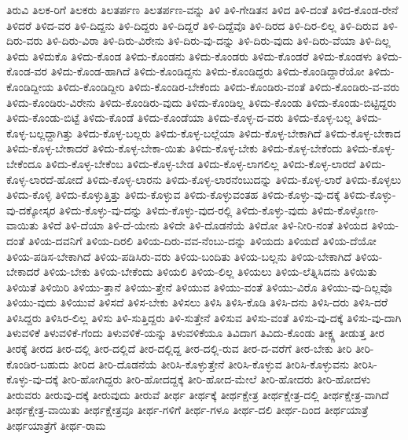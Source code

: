 {ತಿರುವಿ
ತಿಲಕ-ರಿಗೆ
ತಿಲಕರು
ತಿಲತರ್ಪಣ
ತಿಲತರ್ಪಣ-ವನ್ನು
ತಿಳಿ
ತಿಳಿ-ಗೇಡಿತನ
ತಿಳಿದ
ತಿಳಿ-ದಂತೆ
ತಿಳಿದ-ಕೊಂಡ-ರೇನೆ
ತಿಳಿದರೆ
ತಿಳಿದ-ವರ
ತಿಳಿ-ದಿದ್ದನು
ತಿಳಿ-ದಿದ್ದರು
ತಿಳಿ-ದಿದ್ದರೆ
ತಿಳಿ-ದಿದ್ದೆವೊ
ತಿಳಿ-ದಿರದ
ತಿಳಿ-ದಿರ-ಲಿಲ್ಲ
ತಿಳಿ-ದಿರುವ
ತಿಳಿ-ದಿರು-ವರು
ತಿಳಿ-ದಿರು-ವಿರಾ
ತಿಳಿ-ದಿರು-ವಿರೇನು
ತಿಳಿ-ದಿರು-ವು-ದನ್ನು
ತಿಳಿ-ದಿರು-ವುದು
ತಿಳಿ-ದಿರು-ವೆಯಾ
ತಿಳಿ-ದಿಲ್ಲ
ತಿಳಿದು
ತಿಳಿದುಕೊ
ತಿಳಿದು-ಕೊಂಡ
ತಿಳಿದು-ಕೊಂಡನು
ತಿಳಿದು-ಕೊಂಡರು
ತಿಳಿದು-ಕೊಂಡರೆ
ತಿಳಿದು-ಕೊಂಡಳು
ತಿಳಿದು-ಕೊಂಡ-ವರ
ತಿಳಿದು-ಕೊಂಡ-ಹಾಗಿದೆ
ತಿಳಿದು-ಕೊಂಡಿದ್ದನು
ತಿಳಿದು-ಕೊಂಡಿದ್ದರು
ತಿಳಿದು-ಕೊಂಡಿದ್ದಾರೆಯೋ
ತಿಳಿದು-ಕೊಂಡಿದ್ದೀಯ
ತಿಳಿದು-ಕೊಂಡಿದ್ದೀರಿ
ತಿಳಿದು-ಕೊಂಡಿರ-ಬೇಕೆಂದು
ತಿಳಿದು-ಕೊಂಡಿರು-ವಂತೆ
ತಿಳಿದು-ಕೊಂಡಿರು-ವ-ವರು
ತಿಳಿದು-ಕೊಂಡಿರು-ವಿರೇನು
ತಿಳಿದು-ಕೊಂಡಿರು-ವುದು
ತಿಳಿದು-ಕೊಂಡಿಲ್ಲ
ತಿಳಿದು-ಕೊಂಡು
ತಿಳಿದು-ಕೊಂಡು-ಬಿಟ್ಟಿದ್ದರು
ತಿಳಿದು-ಕೊಂಡು-ಬಿಟ್ಟೆ
ತಿಳಿದು-ಕೊಂಡೆ
ತಿಳಿದು-ಕೊಂಡೆಯಾ
ತಿಳಿದು-ಕೊಳ್ಳ-ದ-ವರು
ತಿಳಿದು-ಕೊಳ್ಳ-ಬಲ್ಲ
ತಿಳಿದು-ಕೊಳ್ಳ-ಬಲ್ಲದ್ದಾಗಿತ್ತು
ತಿಳಿದು-ಕೊಳ್ಳ-ಬಲ್ಲರು
ತಿಳಿದು-ಕೊಳ್ಳ-ಬಲ್ಲೆಯಾ
ತಿಳಿದು-ಕೊಳ್ಳ-ಬೇಕಾಗಿದೆ
ತಿಳಿದು-ಕೊಳ್ಳ-ಬೇಕಾದ
ತಿಳಿದು-ಕೊಳ್ಳ-ಬೇಕಾದರೆ
ತಿಳಿದು-ಕೊಳ್ಳ-ಬೇಕಾ-ಯಿತು
ತಿಳಿದು-ಕೊಳ್ಳ-ಬೇಕು
ತಿಳಿದು-ಕೊಳ್ಳ-ಬೇಕೆಂದು
ತಿಳಿದು-ಕೊಳ್ಳ-ಬೇಕೆಂದೂ
ತಿಳಿದು-ಕೊಳ್ಳ-ಬೇಕೆಂಬ
ತಿಳಿದು-ಕೊಳ್ಳ-ಬೇಡ
ತಿಳಿದು-ಕೊಳ್ಳ-ಲಾಗಲಿಲ್ಲ
ತಿಳಿದು-ಕೊಳ್ಳ-ಲಾರದೆ
ತಿಳಿದು-ಕೊಳ್ಳ-ಲಾರದೆ-ಹೋದೆ
ತಿಳಿದು-ಕೊಳ್ಳ-ಲಾರನು
ತಿಳಿದು-ಕೊಳ್ಳ-ಲಾರನೆಂಬುದನ್ನು
ತಿಳಿದು-ಕೊಳ್ಳ-ಲಾರೆ
ತಿಳಿದು-ಕೊಳ್ಳಲು
ತಿಳಿದು-ಕೊಳ್ಳಿ
ತಿಳಿದು-ಕೊಳ್ಳುತ್ತಿತ್ತು
ತಿಳಿದು-ಕೊಳ್ಳುವ
ತಿಳಿದು-ಕೊಳ್ಳುವಂತಹ
ತಿಳಿದು-ಕೊಳ್ಳು-ವು-ದಕ್ಕೆ
ತಿಳಿದು-ಕೊಳ್ಳು-ವು-ದಕ್ಕೋಸ್ಕರ
ತಿಳಿದು-ಕೊಳ್ಳು-ವು-ದನ್ನು
ತಿಳಿದು-ಕೊಳ್ಳು-ವುದ-ರಲ್ಲಿ
ತಿಳಿದು-ಕೊಳ್ಳು-ವುದು
ತಿಳಿದು-ಕೊಳ್ಳೋಣ-ವಾಯಿತು
ತಿಳಿದೆ
ತಿಳಿ-ದೆಯಾ
ತಿಳಿ-ದೆ-ಯೇನು
ತಿಳಿದೇ
ತಿಳಿ-ದೊಡನೆಯೆ
ತಿಳಿದೋ
ತಿಳಿ-ನೀರಿ-ನಂತೆ
ತಿಳಿಯದ
ತಿಳಿಯ-ದಂತೆ
ತಿಳಿಯ-ದವನಿಗೆ
ತಿಳಿಯ-ದಿರಲಿ
ತಿಳಿಯ-ದಿರು-ವವ-ನೆಂಬು-ದನ್ನು
ತಿಳಿಯದು
ತಿಳಿಯದೆ
ತಿಳಿಯ-ದೆಯೋ
ತಿಳಿಯ-ಪಡಿಸ-ಬೇಕಾಗಿದೆ
ತಿಳಿಯ-ಪಡಿಸಿರು-ವರು
ತಿಳಿಯ-ಬಂದಿತು
ತಿಳಿಯ-ಬಲ್ಲನು
ತಿಳಿಯ-ಬೇಕಾಗಿದೆ
ತಿಳಿಯ-ಬೇಕಾದರೆ
ತಿಳಿಯ-ಬೇಕು
ತಿಳಿಯ-ಬೇಕೆಂದು
ತಿಳಿಯಲಿ
ತಿಳಿಯ-ಲಿಲ್ಲ
ತಿಳಿಯಲು
ತಿಳಿಯ-ಲೆತ್ನಿಸಿದನು
ತಿಳಿಯಿತು
ತಿಳಿಯಿತೆ
ತಿಳಿಯಿರಿ
ತಿಳಿಯು-ತ್ತಾನೆ
ತಿಳಿಯು-ತ್ತೇನೆ
ತಿಳಿಯುವ
ತಿಳಿಯು-ವಂತೆ
ತಿಳಿಯು-ವಿರೊ
ತಿಳಿಯು-ವು-ದಿಲ್ಲವೊ
ತಿಳಿಯು-ವುದು
ತಿಳಿಯುವೆ
ತಿಳಿಸದೆ
ತಿಳಿಸ-ಬೇಕು
ತಿಳಿಸಲು
ತಿಳಿಸಿ
ತಿಳಿಸಿ-ಕೊಡಿ
ತಿಳಿಸಿ-ದನು
ತಿಳಿಸಿ-ದರು
ತಿಳಿಸಿ-ದರೆ
ತಿಳಿಸಿದ್ದರು
ತಿಳಿಸಿರ-ಲಿಲ್ಲ
ತಿಳಿಸು
ತಿಳಿ-ಸುತ್ತಿದ್ದರು
ತಿಳಿ-ಸುತ್ತೇನೆ
ತಿಳಿಸುವ
ತಿಳಿಸು-ವಂತೆ
ತಿಳಿಸು-ವು-ದಕ್ಕೆ
ತಿಳಿಸು-ವು-ದಾಗಿ
ತಿಳುವಳಿಕೆ
ತಿಳುವಳಿಕೆ-ಗೆಂದು
ತಿಳುವಳಿಕೆ-ಯನ್ನು
ತಿಳುವಳಿಕೆಯೂ
ತಿವಿದಾಗ
ತಿವಿದು-ಕೊಂಡು
ತೀಕ್ಷ್ಣ
ತೀಡುತ್ತ
ತೀರ
ತೀರಕ್ಕೆ
ತೀರದ
ತೀರ-ದಲ್ಲಿ
ತೀರ-ದಲ್ಲಿದೆ
ತೀರ-ದಲ್ಲಿದ್ದ
ತೀರ-ದಲ್ಲಿ-ರುವ
ತೀರ-ದ-ವರೆಗೆ
ತೀರ-ಬೇಕು
ತೀರಿ
ತೀರಿ-ಕೊಂಡಿರ-ಬಹುದು
ತೀರಿದ
ತೀರಿ-ದೊಡನೆಯೆ
ತೀರಿಸಿ-ಕೊಳ್ಳುತ್ತೇನೆ
ತೀರಿಸಿ-ಕೊಳ್ಳುವ
ತೀರಿಸಿ-ಕೊಳ್ಳುವನು
ತೀರಿಸಿ-ಕೊಳ್ಳು-ವು-ದಕ್ಕೆ
ತೀರಿ-ಹೋಗಿದ್ದರು
ತೀರಿ-ಹೋದದ್ದಕ್ಕೆ
ತೀರಿ-ಹೋದ-ಮೇಲೆ
ತೀರಿ-ಹೋದರು
ತೀರಿ-ಹೋದಳು
ತೀರುವರು
ತೀರುವು-ದಕ್ಕೆ
ತೀರುವುದು
ತೀರುವೆ
ತೀರ್ಥ
ತೀರ್ಥಕ್ಕೆ
ತೀರ್ಥಕ್ಷೇತ್ರ
ತೀರ್ಥಕ್ಷೇತ್ರ-ದಲ್ಲಿ
ತೀರ್ಥಕ್ಷೇತ್ರ-ವಾಗಿದೆ
ತೀರ್ಥಕ್ಷೇತ್ರ-ವಾಯಿತು
ತೀರ್ಥಕ್ಷೇತ್ರವೂ
ತೀರ್ಥ-ಗಳಿಗೆ
ತೀರ್ಥ-ಗಳೂ
ತೀರ್ಥ-ದಲಿ
ತೀರ್ಥ-ದಿಂದ
ತೀರ್ಥಯಾತ್ರೆ
ತೀರ್ಥಯಾತ್ರೆಗೆ
ತೀರ್ಥ-ರಾಮ
}
